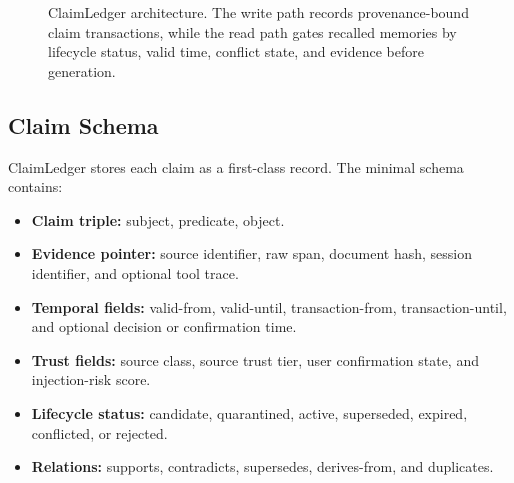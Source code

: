 \begin{figure}[!t]
\caption{ClaimLedger architecture. The write path records provenance-bound claim transactions, while the read path gates recalled memories by lifecycle status, valid time, conflict state, and evidence before generation.}
\label{fig:architecture}
\end{figure}

\subsection{Claim Schema}\label{sec:claim-schema}

ClaimLedger stores each claim as a first-class record. The minimal schema contains:

\begin{itemize}
\item \textbf{Claim triple:} subject, predicate, object.
\item \textbf{Evidence pointer:} source identifier, raw span, document hash, session identifier, and optional tool trace.
\item \textbf{Temporal fields:} valid-from, valid-until, transaction-from, transaction-until, and optional decision or confirmation time.
\item \textbf{Trust fields:} source class, source trust tier, user confirmation state, and injection-risk score.
\item \textbf{Lifecycle status:} candidate, quarantined, active, superseded, expired, conflicted, or rejected.
\item \textbf{Relations:} supports, contradicts, supersedes, derives-from, and duplicates.
\end{itemize}

